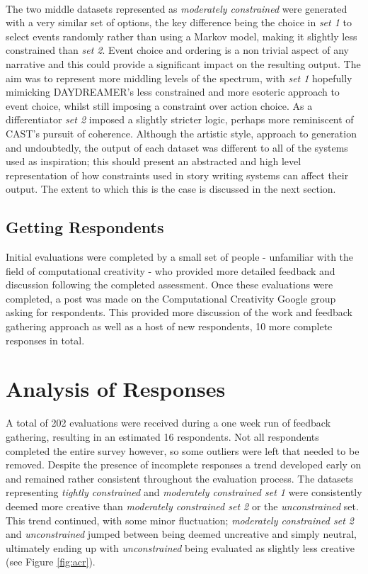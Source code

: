 \documentclass[letterpaper]{article}
\begin{document}
\\The two middle datasets represented as \emph{moderately constrained} were generated with a very similar set of options, the key difference being the choice in \emph{set 1} to select events randomly rather than using a Markov model, making it slightly less constrained than \emph{set 2}. Event choice and ordering is a non trivial aspect of any narrative and this could provide a significant impact on the resulting output. The aim was to represent more middling levels of the spectrum, with \emph{set 1} hopefully mimicking DAYDREAMER's less constrained and more esoteric approach to event choice, whilst still imposing a constraint over action choice. As a differentiator \emph{set 2} imposed a slightly stricter logic, perhaps more reminiscent of CAST's pursuit of coherence. Although the artistic style, approach to generation and undoubtedly, the output of each dataset was different to all of the systems used as inspiration; this should present an abstracted and high level representation of how constraints used in story writing systems can affect their output. The extent to which this is the case is discussed in the next section.

\subsection{Getting Respondents}
Initial evaluations were completed by a small set of people - unfamiliar with the field of computational creativity - who provided more detailed feedback and discussion following the completed assessment. Once these evaluations were completed, a post was made on the Computational Creativity Google group asking for respondents. This provided more discussion of the work and feedback gathering approach as well as a host of new respondents, 10 more complete responses in total. 

\section{Analysis of Responses}
A total of 202 evaluations were received during a one week run of feedback gathering, resulting in an estimated 16 respondents. Not all respondents completed the entire survey however, so some outliers were left that needed to be removed. 
Despite the presence of incomplete responses a trend developed early on and remained rather consistent throughout the evaluation process. The datasets representing \emph{tightly constrained} and \emph{moderately constrained set 1} were consistently deemed more creative than \emph{moderately constrained set 2} or the \emph{unconstrained} set. This trend continued, with some minor fluctuation; \emph{moderately constrained set 2} and \emph{unconstrained} jumped between being deemed uncreative and simply neutral,  ultimately ending up with \emph{unconstrained} being evaluated as slightly less creative (see Figure \ref{fig:acr}). 
\end{document}
